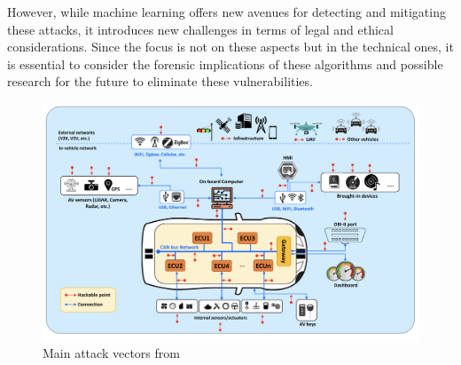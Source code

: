 However, while machine learning offers new avenues for detecting and mitigating these attacks, it introduces new challenges in terms of legal and ethical considerations.
Since the focus is not on these aspects but in the technical ones, it is essential to consider the forensic implications
of these algorithms\cite{durlik2022cybersecurity, cybersecurity2022forensics} and possible research for the future to eliminate these vulnerabilities.

\begin{figure}[!htb]
    \centering
    \includegraphics[width=0.7\linewidth]{figures/vectors}
    \caption{Main attack vectors from \cite{bendiab2023autonomous}}
    \label{fig:attack-vectors}
\end{figure}
